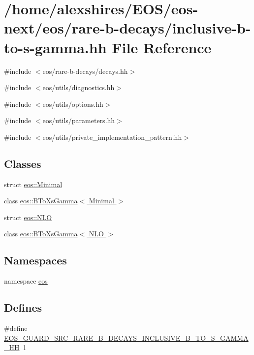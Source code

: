 \hypertarget{inclusive-b-to-s-gamma_8hh}{
\section{/home/alexshires/EOS/eos-\/next/eos/rare-\/b-\/decays/inclusive-\/b-\/to-\/s-\/gamma.hh File Reference}
\label{inclusive-b-to-s-gamma_8hh}
}
{\ttfamily \#include $<$eos/rare-\/b-\/decays/decays.hh$>$}\par
{\ttfamily \#include $<$eos/utils/diagnostics.hh$>$}\par
{\ttfamily \#include $<$eos/utils/options.hh$>$}\par
{\ttfamily \#include $<$eos/utils/parameters.hh$>$}\par
{\ttfamily \#include $<$eos/utils/private\_\-implementation\_\-pattern.hh$>$}\par
\subsection*{Classes}
\begin{DoxyCompactItemize}
\item 
struct \hyperlink{structeos_1_1Minimal}{eos::Minimal}
\item 
class \hyperlink{classeos_1_1BToXsGamma_3_01Minimal_01_4}{eos::BToXsGamma$<$ Minimal $>$}
\item 
struct \hyperlink{structeos_1_1NLO}{eos::NLO}
\item 
class \hyperlink{classeos_1_1BToXsGamma_3_01NLO_01_4}{eos::BToXsGamma$<$ NLO $>$}
\end{DoxyCompactItemize}
\subsection*{Namespaces}
\begin{DoxyCompactItemize}
\item 
namespace \hyperlink{namespaceeos}{eos}
\end{DoxyCompactItemize}
\subsection*{Defines}
\begin{DoxyCompactItemize}
\item 
\#define \hyperlink{inclusive-b-to-s-gamma_8hh_a11a2e97fb82dee569be0903a8b93df5c}{EOS\_\-GUARD\_\-SRC\_\-RARE\_\-B\_\-DECAYS\_\-INCLUSIVE\_\-B\_\-TO\_\-S\_\-GAMMA\_\-HH}~1
\end{DoxyCompactItemize}


